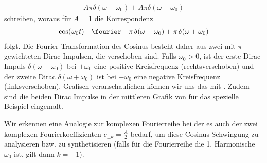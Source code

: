 \begin{mdframed}
\begin{align}
A \pi \delta(\omega-\omega_0) + A \pi \delta(\omega+\omega_0)
\end{align}
schreiben, woraus für $A=1$ die Korrespondenz
\begin{align}
\cos(\omega_0 t) \quad\fourier\quad \pi \, \delta(\omega-\omega_0) + \pi \, \delta(\omega+\omega_0)
\end{align}
folgt.
%
Die Fourier-Transformation des Cosinus besteht daher aus zwei mit $\pi$ gewichteten
Dirac-Impulsen, die verschoben sind. Falls $\omega_0>0$, ist der erste
Dirac-Impuls $\delta(\omega-\omega_0)$ bei $+\omega_0$ eine positive Kreisfrequenz
(rechtsverschoben)
und der zweite Dirac $\delta(\omega+\omega_0)$ ist bei $-\omega_0$ eine
negative Kreisfrequenz (linksverschoben).
%
Grafisch veranschaulichen können wir uns das mit .
%
Zudem sind die beiden Dirac Impulse in der mittleren Grafik von
 für das spezielle Beispiel eingemalt.
%

Wir erkennen eine Analogie zur komplexen Fourierreihe bei der es auch der
zwei komplexen Fourierkoeffizienten $c_{\pm k} = \frac{A}{2}$ bedarf, um diese
Cosinus-Schwingung zu analysieren bzw. zu synthetisieren (falls für die
Fourierreihe die 1. Harmonische $\omega_0$ ist, gilt dann $k=\pm 1$).
\end{mdframed}



